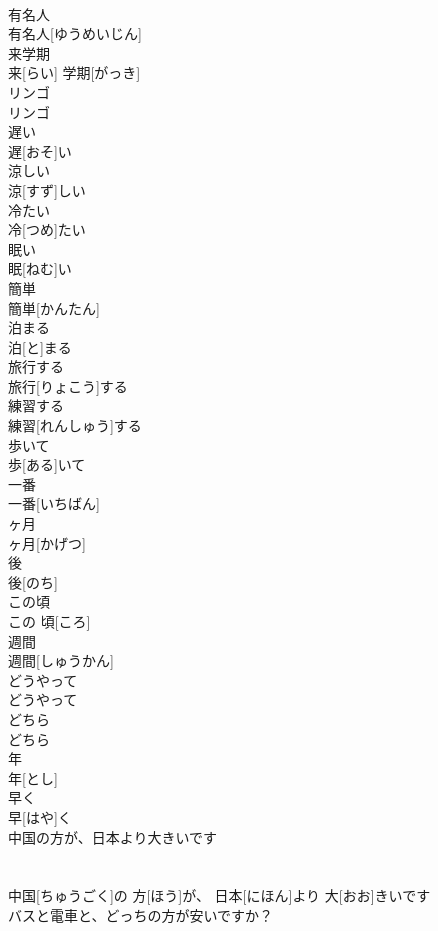 \documentclass[8pt]{extreport}
\begin{document}
\begin{CJK}{UTF8}{min}
\\	有名人	
\\	有名人[ゆうめいじん]		
\\	来学期	
\\	来[らい] 学期[がっき]		
\\	リンゴ	
\\	リンゴ		
\\	遅い	
\\	遅[おそ]い		
\\	涼しい	
\\	涼[すず]しい		
\\	冷たい	
\\	冷[つめ]たい		
\\	眠い	
\\	眠[ねむ]い		
\\	簡単	
\\	簡単[かんたん]		
\\	泊まる	
\\	泊[と]まる		
\\	旅行する	
\\	旅行[りょこう]する		
\\	練習する	
\\	練習[れんしゅう]する		
\\	歩いて	
\\	歩[ある]いて		
\\	一番	
\\	一番[いちばん]		
\\	ヶ月	
\\	ヶ月[かげつ]		
\\	後	
\\	後[のち]		
\\	この頃	
\\	この 頃[ころ]		
\\	週間	
\\	週間[しゅうかん]		
\\	どうやって	
\\	どうやって		
\\	どちら	
\\	どちら		
\\	年	
\\	年[とし]		
\\	早く	
\\	早[はや]く		
\\	中国の方が、日本より大きいです	
\\	[~の方が] 
\\	[~より] 
\\	中国[ちゅうごく]の 方[ほう]が、 日本[にほん]より 大[おお]きいです	
\\	バスと電車と、どっちの方が安いですか？	

\end{CJK}
\end{document}

